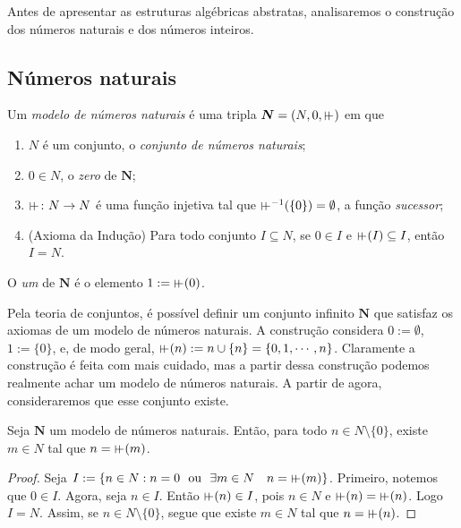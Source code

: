 Antes de apresentar as estruturas algébricas abstratas, analisaremos o construção dos números naturais e dos números inteiros.

\subsection{Números naturais}

\begin{definition}
	Um \emph{modelo de números naturais} é uma tripla $\bm N = (N,0,\suce)$ em que
	\begin{enumerate}
	\item $N$ é um conjunto, o \emph{conjunto de números naturais};
	\item $0 \in N$, o \emph{zero} de $\bm N$;
	\item $\suce\colon N \to N$ é uma função injetiva tal que $\suce\inv(\{0\})=\emptyset$, a função \emph{sucessor};
	\item (Axioma da Indução) Para todo conjunto $I \subseteq N$, se $0 \in I$ e $\suce(I) \subseteq I$, então $I=N$.
	\end{enumerate}
O \emph{um} de $\bm N$ é o elemento $1 := \suce(0)$.
\end{definition}

Pela teoria de conjuntos, é possível definir um conjunto infinito $\bm N$ que satisfaz os axiomas de um modelo de números naturais. A construção considera $0 := \emptyset$, $1 := \{0\}$, e, de modo geral, $\suce(n) := n \cup \{n\} = \{0,1,\cdots,n\}$. Claramente a construção é feita com mais cuidado, mas a partir dessa construção podemos realmente achar um modelo de números naturais. A partir de agora, consideraremos que esse conjunto existe.

\begin{proposition}
	Seja $\bm N$ um  modelo de números naturais. Então, para todo $n \in N\setminus \{0\}$, existe $m \in N$ tal que $n=\suce(m)$.
\end{proposition}
\begin{proof}
	Seja $I := \{n \in N:n=0 \text{\ \ ou\ \ } \exists m \in N \quad n=\suce(m)\}$. Primeiro, notemos que $0 \in I$. Agora, seja $n \in I$. Então $\suce(n) \in I$, pois $n \in N$ e $\suce(n)=\suce(n)$. Logo $I=N$. Assim, se $n \in N \setminus \{0\}$, segue que existe $m \in N$ tal que $n=\suce(n)$.
\end{proof}

